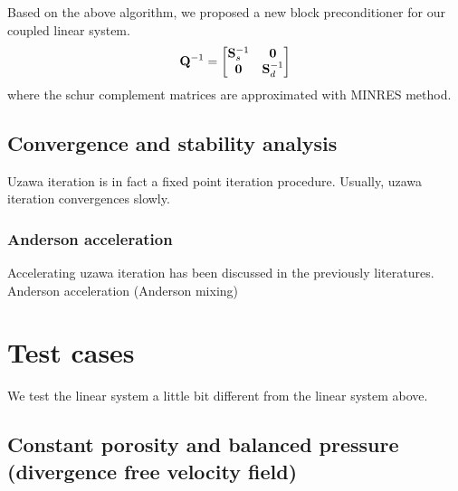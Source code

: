 Based on the above algorithm, we proposed a new block preconditioner for our
coupled linear system.
\begin{equation}
		  \bold{Q}^{-1} = \begin{bmatrix}
					 \bold{S}_s^{-1} & \bold{0} \\
					 \bold{0} & \bold{S}_d^{-1}
		  \end{bmatrix}
\end{equation}
where the schur complement matrices are approximated with MINRES method.

\subsection{Convergence and stability analysis}
Uzawa iteration is in fact a fixed point iteration procedure.
Usually, uzawa iteration convergences slowly.

\subsubsection{Anderson acceleration}
Accelerating uzawa iteration has been discussed in the previously literatures.
Anderson acceleration (Anderson mixing) \cite{AcceleratingUzawa_ho_Olson_Walker}

\newpage

\section{Test cases}
We test the linear system a little bit different from the linear system above. 
\subsection{Constant porosity and balanced pressure (divergence free velocity field)}


